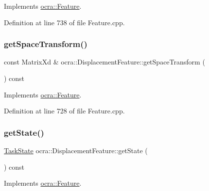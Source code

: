 Implements \hyperlink{classocra_1_1Feature_aeda4c2a5ffe638c3de30f8b91a11450e}{ocra\+::\+Feature}.



Definition at line 738 of file Feature.\+cpp.

\hypertarget{classocra_1_1DisplacementFeature_ad27f4aa83abea99ef893de6043b0bf68}{}\label{classocra_1_1DisplacementFeature_ad27f4aa83abea99ef893de6043b0bf68} 
\subsubsection{\texorpdfstring{get\+Space\+Transform()}{getSpaceTransform()}}
{\footnotesize\ttfamily const Matrix\+Xd \& ocra\+::\+Displacement\+Feature\+::get\+Space\+Transform (\begin{DoxyParamCaption}{ }\end{DoxyParamCaption}) const\hspace{0.3cm}{\ttfamily [virtual]}}



Implements \hyperlink{classocra_1_1Feature_a77eb324fb4da91fd50d0e761d2453ff3}{ocra\+::\+Feature}.



Definition at line 728 of file Feature.\+cpp.

\hypertarget{classocra_1_1DisplacementFeature_a3940d5c27ee1845c65f4be6ad3a27e50}{}\label{classocra_1_1DisplacementFeature_a3940d5c27ee1845c65f4be6ad3a27e50} 
\subsubsection{\texorpdfstring{get\+State()}{getState()}}
{\footnotesize\ttfamily \hyperlink{classocra_1_1TaskState}{Task\+State} ocra\+::\+Displacement\+Feature\+::get\+State (\begin{DoxyParamCaption}{ }\end{DoxyParamCaption}) const\hspace{0.3cm}{\ttfamily [virtual]}}



Implements \hyperlink{classocra_1_1Feature_a792434ceb793f25874b8fe42ae24c475}{ocra\+::\+Feature}.



